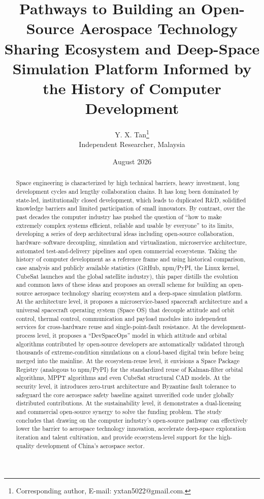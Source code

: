 \documentclass[11pt]{article}
\title{Pathways to Building an Open-Source Aerospace Technology Sharing Ecosystem and Deep-Space Simulation Platform Informed by the History of Computer Development}
\author{Y. X. Tan\thanks{Corresponding author, E-mail: yxtan5022@gmail.com.}\\
\small Independent Researcher, Malaysia}
\date{August 2026}
\begin{document}
\maketitle

\begin{abstract}
Space engineering is characterized by high technical barriers, heavy investment, long development cycles and lengthy collaboration chains. It has long been dominated by state-led, institutionally closed development, which leads to duplicated R\&D, solidified knowledge barriers and limited participation of small innovators. By contrast, over the past decades the computer industry has pushed the question of ``how to make extremely complex systems efficient, reliable and usable by everyone'' to its limits, developing a series of deep architectural ideas including open-source collaboration, hardware--software decoupling, simulation and virtualization, microservice architecture, automated test-and-delivery pipelines and open commercial ecosystems. Taking the history of computer development as a reference frame and using historical comparison, case analysis and publicly available statistics (GitHub, npm/PyPI, the Linux kernel, CubeSat launches and the global satellite industry), this paper distills the evolution and common laws of these ideas and proposes an overall scheme for building an open-source aerospace technology sharing ecosystem and a deep-space simulation platform. At the architecture level, it proposes a microservice-based spacecraft architecture and a universal spacecraft operating system (Space OS) that decouple attitude and orbit control, thermal control, communication and payload modules into independent services for cross-hardware reuse and single-point-fault resistance. At the development-process level, it proposes a ``DevSpaceOps'' model in which attitude and orbital algorithms contributed by open-source developers are automatically validated through thousands of extreme-condition simulations on a cloud-based digital twin before being merged into the mainline. At the ecosystem-reuse level, it envisions a Space Package Registry (analogous to npm/PyPI) for the standardized reuse of Kalman-filter orbital algorithms, MPPT algorithms and even CubeSat structural CAD models. At the security level, it introduces zero-trust architecture and Byzantine fault tolerance to safeguard the core aerospace safety baseline against unverified code under globally distributed contributions. At the sustainability level, it demonstrates a dual-licensing and commercial open-source synergy to solve the funding problem. The study concludes that drawing on the computer industry's open-source pathway can effectively lower the barrier to aerospace technology innovation, accelerate deep-space exploration iteration and talent cultivation, and provide ecosystem-level support for the high-quality development of China's aerospace sector.
\end{abstract}
\end{document}
